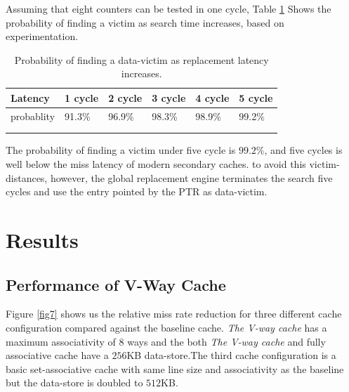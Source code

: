 \documentclass{report}
\begin{document}
\vspace{.8cm}
Assuming that eight counters can be tested in one cycle, Table \ref{table1} Shows the probability of finding a victim as search time increases, based on experimentation.
\vspace{.8cm}
\begin{table}[h!]
\centering
\caption{Probability of finding a data-victim as replacement latency increases. }
\label{table1}
\begin{tabular}{llllll}
\hline
\multicolumn{1}{|l|}{Latency}    & \multicolumn{1}{l|}{1 cycle} & \multicolumn{1}{l|}{2 cycle} & \multicolumn{1}{l|}{3 cycle} & \multicolumn{1}{l|}{4 cycle} & \multicolumn{1}{l|}{5 cycle} \\ \hline
\multicolumn{1}{|l|}{probablity} & \multicolumn{1}{l|}{91.3\%}  & \multicolumn{1}{l|}{96.9\%}  & \multicolumn{1}{l|}{98.3\%}  & \multicolumn{1}{l|}{98.9\%}  & \multicolumn{1}{l|}{99.2\%}  \\ \hline
                                 &                              &                              &                              &                              &                              \\
                                 &                              &                              &                              &                              &                             
\end{tabular}
\end{table}

The probability of finding a victim under five cycle is $99.2\% $, and five cycles is well below the miss latency of modern secondary caches. to avoid this victim-distances, however, the global replacement engine terminates the search five cycles and use the entry pointed by the PTR as data-victim.

\section{ Results}
\subsection{Performance of V-Way Cache}
\vspace{1cm}
Figure \ref{fig7} shows us the relative miss rate reduction for three different cache configuration compared against the baseline cache. \emph{The V-way cache} has a maximum associativity of 8 ways and the both  \emph{The V-way cache} and fully associative cache have a $256$KB data-store.The third cache configuration is a basic set-associative cache with same line size and associativity as the baseline but the data-store is doubled to $512$KB.
\end{document}
